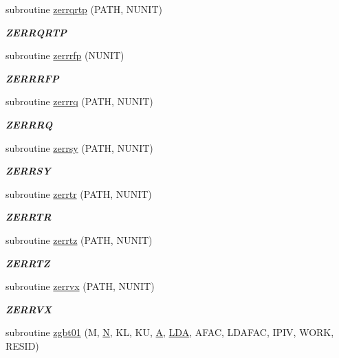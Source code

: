 \begin{DoxyCompactItemize}
subroutine \hyperlink{group__complex16__lin_ga46df602571824842eac873f7e1e4bacf}{zerrqrtp} (P\+A\+T\+H, N\+U\+N\+I\+T)
\begin{DoxyCompactList}\small\item\em {\bfseries Z\+E\+R\+R\+Q\+R\+T\+P} \end{DoxyCompactList}\item 
subroutine \hyperlink{group__complex16__lin_ga28c5999b94bcb2329f73db89500dc07f}{zerrrfp} (N\+U\+N\+I\+T)
\begin{DoxyCompactList}\small\item\em {\bfseries Z\+E\+R\+R\+R\+F\+P} \end{DoxyCompactList}\item 
subroutine \hyperlink{group__complex16__lin_gae1dd0ee22ced8a9d47e5525b762d9d23}{zerrrq} (P\+A\+T\+H, N\+U\+N\+I\+T)
\begin{DoxyCompactList}\small\item\em {\bfseries Z\+E\+R\+R\+R\+Q} \end{DoxyCompactList}\item 
subroutine \hyperlink{group__complex16__lin_gaf8de6a58d2c4ecc150d11a8cfaa5e67c}{zerrsy} (P\+A\+T\+H, N\+U\+N\+I\+T)
\begin{DoxyCompactList}\small\item\em {\bfseries Z\+E\+R\+R\+S\+Y} \end{DoxyCompactList}\item 
subroutine \hyperlink{group__complex16__lin_gaf3dea0d7831bc583edb20e306caf6b82}{zerrtr} (P\+A\+T\+H, N\+U\+N\+I\+T)
\begin{DoxyCompactList}\small\item\em {\bfseries Z\+E\+R\+R\+T\+R} \end{DoxyCompactList}\item 
subroutine \hyperlink{group__complex16__lin_gaadc274b76fc8a28edbf328dec7c7575e}{zerrtz} (P\+A\+T\+H, N\+U\+N\+I\+T)
\begin{DoxyCompactList}\small\item\em {\bfseries Z\+E\+R\+R\+T\+Z} \end{DoxyCompactList}\item 
subroutine \hyperlink{group__complex16__lin_ga47bf3369481a967271fcd380d5261926}{zerrvx} (P\+A\+T\+H, N\+U\+N\+I\+T)
\begin{DoxyCompactList}\small\item\em {\bfseries Z\+E\+R\+R\+V\+X} \end{DoxyCompactList}\item 
subroutine \hyperlink{group__complex16__lin_ga0126a2ab78162cd15e37a138892af0c2}{zgbt01} (M, \hyperlink{polmisc_8c_a0240ac851181b84ac374872dc5434ee4}{N}, K\+L, K\+U, \hyperlink{classA}{A}, \hyperlink{example__user_8c_ae946da542ce0db94dced19b2ecefd1aa}{L\+D\+A}, A\+F\+A\+C, L\+D\+A\+F\+A\+C, I\+P\+I\+V, W\+O\+R\+K, R\+E\+S\+I\+D)

\end{DoxyCompactItemize}
